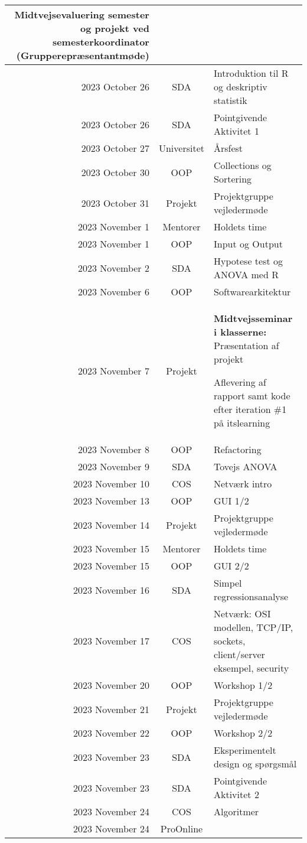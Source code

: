 \begin{longtable}{|r|c|p{}|}
Midtvejsevaluering semester og projekt ved semesterkoordinator (Grupperepræsentantmøde) \\
  \hline
  2023 October 26 & SDA & Introduktion til R og deskriptiv statistik \\
  \hline
  \rowcolor{orange}2023 October 26 & SDA & Pointgivende Aktivitet 1 \\
  \hline
  2023 October 27 & Universitet & Årsfest \\
  \hline
  2023 October 30 & OOP & Collections og Sortering \\
  \hline
  2023 October 31 & Projekt & Projektgruppe vejledermøde \\
  \hline
  2023 November 1 & Mentorer & Holdets time \\
  \hline
  2023 November 1 & OOP & Input og Output \\
  \hline
  2023 November 2 & SDA & Hypotese test og ANOVA med R \\
  \hline
  2023 November 6 & OOP & Softwarearkitektur \\
  \hline
  2023 November 7 & Projekt & \textbf{Midtvejsseminar i klasserne:} Præsentation af projekt

Aflevering af rapport samt kode efter iteration \#1 på itslearning \\
  \hline
  2023 November 8 & OOP & Refactoring \\
  \hline
  2023 November 9 & SDA & Tovejs ANOVA \\
  \hline
  2023 November 10 & COS & Netværk intro \\
  \hline
  2023 November 13 & OOP & GUI 1/2 \\
  \hline
  2023 November 14 & Projekt & Projektgruppe vejledermøde \\
  \hline
  2023 November 15 & Mentorer & Holdets time \\
  \hline
  2023 November 15 & OOP & GUI 2/2 \\
  \hline
  2023 November 16 & SDA & Simpel regressionsanalyse \\
  \hline
  2023 November 17 & COS & Netværk: OSI modellen, TCP/IP, sockets, client/server eksempel, security \\
  \hline
  2023 November 20 & OOP & Workshop 1/2 \\
  \hline
  2023 November 21 & Projekt & Projektgruppe vejledermøde \\
  \hline
  2023 November 22 & OOP & Workshop 2/2 \\
  \hline
  2023 November 23 & SDA & Eksperimentelt design og spørgsmål \\
  \hline
  \rowcolor{orange}2023 November 23 & SDA & Pointgivende Aktivitet 2 \\
  \hline
  2023 November 24 & COS & Algoritmer \\
  \hline
  2023 November 24 & ProOnline & \begin{itemize}[noitemsep,leftmargin=*,topsep=0pt,partopsep=0pt]


\end{itemize}
\end{longtable}
